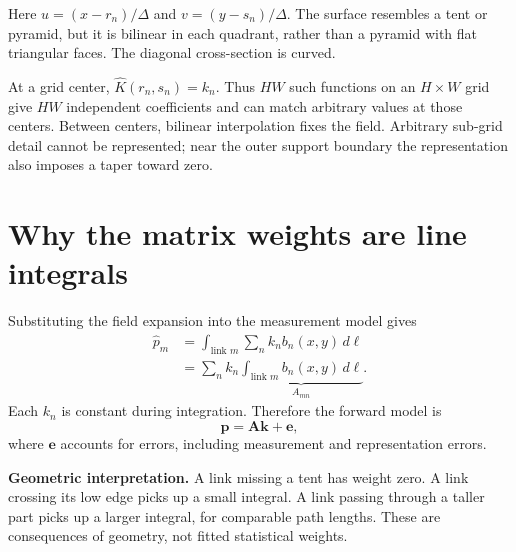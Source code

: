 \documentclass[11pt,a4paper]{article}
\newcommand{\vect}[1]{\mathbf{#1}}
\begin{document}
\begin{center}
\end{center}
Here $u=(x-r_n)/\Delta$ and $v=(y-s_n)/\Delta$. The surface resembles a tent or pyramid, but it is bilinear in each quadrant, rather than a pyramid with flat triangular faces. The diagonal cross-section is curved.

At a grid center, $\widehat K(r_n,s_n)=k_n$. Thus $HW$ such functions on an $H\times W$ grid give $HW$ independent coefficients and can match arbitrary values at those centers. Between centers, bilinear interpolation fixes the field. Arbitrary sub-grid detail cannot be represented; near the outer support boundary the representation also imposes a taper toward zero.
\section{Why the matrix weights are line integrals}
Substituting the field expansion into the measurement model gives
\begin{align}
\widehat p_m
&=\int_{\text{link }m}\sum_n k_n b_n(x,y)\,d\ell\\
&=\sum_n k_n\underbrace{\int_{\text{link }m}b_n(x,y)\,d\ell}_{A_{mn}}.
\end{align}
Each $k_n$ is constant during integration. Therefore the forward model is
\begin{equation}
\vect p=\vect A\vect k+\vect e,
\end{equation}
where $\vect e$ accounts for errors, including measurement and representation errors.

\textbf{Geometric interpretation.} A link missing a tent has weight zero. A link crossing its low edge picks up a small integral. A link passing through a taller part picks up a larger integral, for comparable path lengths. These are consequences of geometry, not fitted statistical weights.
\end{document}
